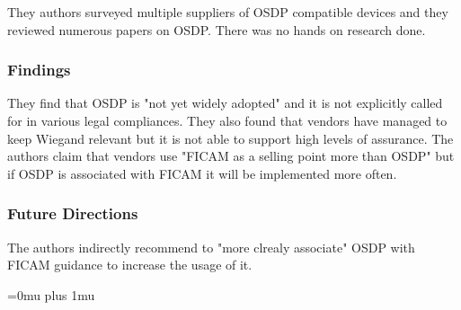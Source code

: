 \noindent
They authors surveyed multiple suppliers of OSDP compatible devices and they reviewed numerous papers on OSDP.  There was no hands on research done.

\subsubsection{Findings}

\noindent
They find that OSDP is "not yet widely adopted" and it is not explicitly called for in various legal compliances.  They also found that vendors have managed to keep Wiegand relevant but it is not able to support high levels of assurance.  The authors claim that vendors use "FICAM as a selling point more than OSDP" but if OSDP is associated with FICAM it will be implemented more often.

\subsubsection{Future Directions}

\noindent
The authors indirectly recommend to "more clrealy associate" OSDP with FICAM guidance to increase the usage of it.

\Urlmuskip=0mu plus 1mu\relax
\pagebreak
